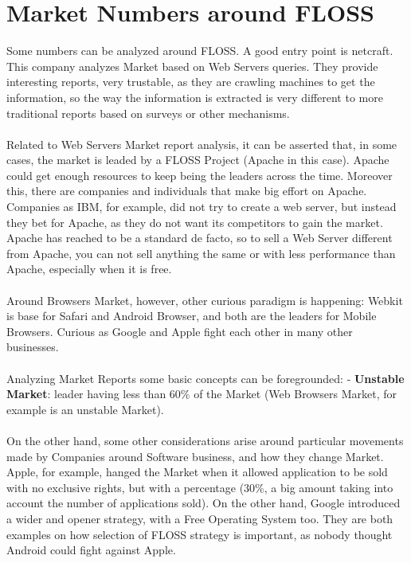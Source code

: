 \section{Market Numbers around FLOSS}\label{MARKET_FLOSS} 
Some numbers can be analyzed around FLOSS. A good entry point is netcraft. This company analyzes Market based on Web Servers queries. They provide interesting reports, very trustable, as they are crawling machines to get the information, so the way the information is extracted is very different to more traditional reports based on surveys or other mechanisms.\\
\\
Related to Web Servers Market report analysis, it can be asserted that, in some cases, the market is leaded by a FLOSS Project (Apache in this case). Apache could get enough resources to keep being the leaders across the time. Moreover this, there are companies and individuals that make big effort on Apache. Companies as IBM, for example, did not try to create a web server, but instead they bet for Apache, as they do not want its competitors to gain the market. Apache has reached to be a standard de facto, so to sell a Web Server different from Apache, you can not sell anything the same or with less performance than Apache, especially when it is free.\\
\\
Around Browsers Market, however, other curious paradigm is happening: Webkit is base for Safari and Android Browser, and both are the leaders for Mobile Browsers. Curious as Google and Apple fight each other in many other businesses.\\
\\
Analyzing Market Reports some basic concepts can be foregrounded: 
- \textbf{Unstable Market}: leader having less than 60\% of the Market (Web Browsers Market, for example is an unstable Market).\\
\\
On the other hand, some other considerations arise around particular movements made by Companies around Software business, and how they change Market. Apple, for example,  hanged the Market when it allowed application to be sold with no exclusive rights, but with a percentage (30\%, a big amount taking into account the number of applications sold). On the other hand, Google introduced a wider and opener strategy, with a Free Operating System too. They are both examples on how selection of FLOSS strategy is important, as nobody thought Android could fight against Apple.\\
